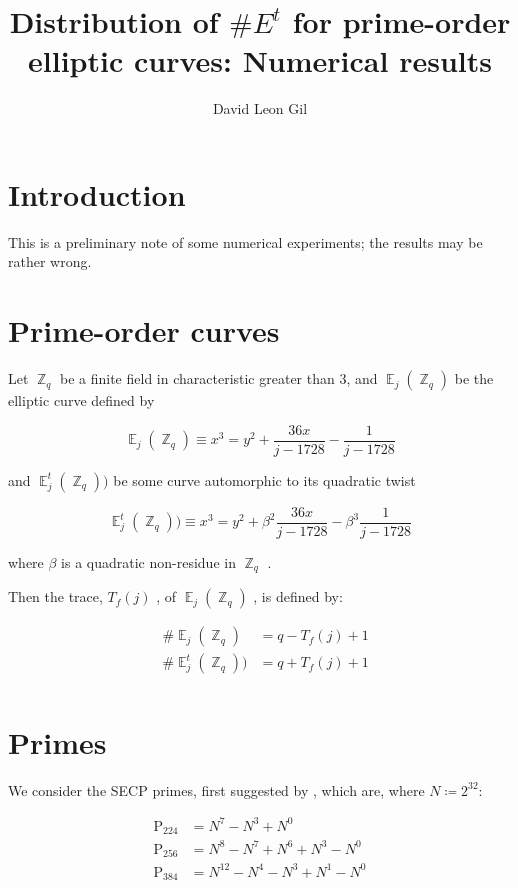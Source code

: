 \documentclass[11pt,fleqn]{article}
\title{Distribution of $\#E^t$ for prime-order elliptic curves: Numerical results}
\author{David Leon Gil}
\newcommand{\Zq}{\ensuremath{\BbbZ_q} }
\newcommand{\Ej}{\ensuremath{\BbbE_j(\BbbZ_q)} }
\newcommand{\Ejt}{\ensuremath{\BbbE^t_j(\BbbZ_q))} }
\newcommand{\Tf}{\ensuremath{T_f(j)} }
\newcommand{\Pa}{\ensuremath{\mathup{P}_{224}} }
\newcommand{\Pb}{\ensuremath{\mathup{P}_{256}} }
\newcommand{\Pc}{\ensuremath{\mathup{P}_{384}} }
\begin{document}
\maketitle

\section{Introduction}

This is a preliminary note of some numerical experiments; the results
may be rather wrong.

\section{Prime-order curves}

Let $\Zq$ be a finite field in characteristic greater than 3, and
$\Ej$ be the elliptic curve defined by

\begin{equation}
\Ej \equiv x^3 = y^2 + \frac{36 x}{j - 1728} - \frac{1}{j - 1728}
\end{equation}

and $\Ejt$ be some curve automorphic to its quadratic twist

\begin{equation}
\Ejt \equiv x^3 = y^2 + \beta^2 \frac{36 x}{j - 1728} - \beta^3 \frac{1}{j - 1728}
\end{equation}

where $\beta$ is a quadratic non-residue in \Zq.

Then the trace, \Tf, of \Ej, is defined by:

\begin{equation}
\begin{aligned}
&\#\Ej  &= q - \Tf + 1 \\
&\#\Ejt &= q + \Tf + 1 \\
\end{aligned}
\end{equation}

\section{Primes}

We consider the SECP primes, first suggested by \autocite{Solinas}, which are,
where $N \coloneqq 2^{32}$:

\begin{equation}
\begin{aligned}
    \Pa &= N^7 - N^3 + N^0                \\
    \Pb &= N^8 - N^7 + N^6 + N^3 - N^0    \\
    \Pc &= N^{12} - N^4 - N^3 + N^1 - N^0
\end{aligned}
\end{equation}
\end{document}
